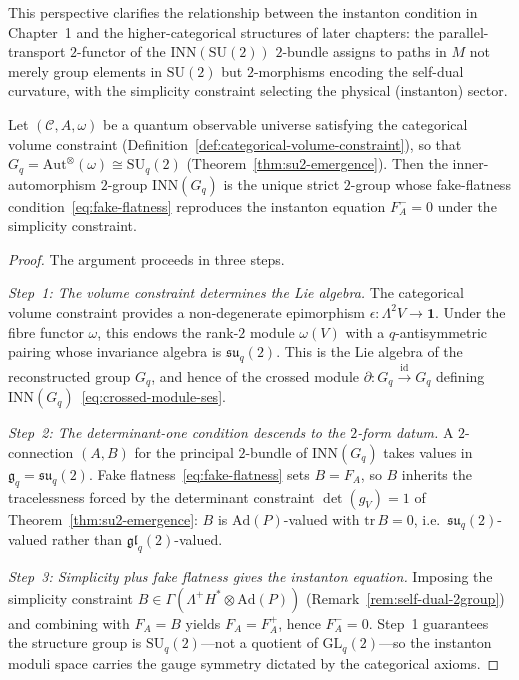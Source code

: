 \begin{remark}
This perspective clarifies the relationship between the instanton
condition in Chapter~1 and the higher-categorical structures of later
chapters: the parallel-transport $2$-functor of the
$\mathrm{INN}(\mathrm{SU}(2))$ $2$-bundle assigns to paths in $M$
not merely group elements in $\mathrm{SU}(2)$ but $2$-morphisms
encoding the self-dual curvature, with the simplicity constraint
selecting the physical (instanton) sector.
\end{remark}

\begin{proposition}
\label{prop:emergence-to-fake-flat}
Let $(\mathcal{C}, A, \omega)$ be a quantum observable universe satisfying
the categorical volume constraint
(Definition~\ref{def:categorical-volume-constraint}), so that
$G_q = \mathrm{Aut}^{\otimes}(\omega) \cong \mathrm{SU}_q(2)$
(Theorem~\ref{thm:su2-emergence}).  Then the inner-automorphism
$2$-group $\mathrm{INN}(G_q)$ is the unique strict $2$-group whose
fake-flatness condition~\eqref{eq:fake-flatness} reproduces the
instanton equation $F_A^{-} = 0$ under the simplicity constraint.
\end{proposition}

\begin{proof}
The argument proceeds in three steps.

\emph{Step~1: The volume constraint determines the Lie algebra.}\;
The categorical volume constraint provides a non-degenerate epimorphism
$\epsilon \colon \Lambda^2 V \to \mathbf{1}$.  Under the fibre functor
$\omega$, this endows the rank-$2$ module $\omega(V)$ with a
$q$-antisymmetric pairing whose invariance algebra is
$\mathfrak{su}_q(2)$.  This is the Lie algebra of the reconstructed
group $G_q$, and hence of the crossed module
$\partial \colon G_q \xrightarrow{\mathrm{id}} G_q$ defining
$\mathrm{INN}(G_q)$~\eqref{eq:crossed-module-ses}.

\emph{Step~2: The determinant-one condition descends to the
$2$-form datum.}\;
A $2$-connection $(A, B)$ for the principal $2$-bundle of
$\mathrm{INN}(G_q)$ takes values in
$\mathfrak{g}_q = \mathfrak{su}_q(2)$.  Fake
flatness~\eqref{eq:fake-flatness} sets $B = F_A$, so $B$ inherits the
tracelessness forced by the determinant constraint
$\det(g_V) = 1$ of Theorem~\ref{thm:su2-emergence}: $B$ is
$\mathrm{Ad}(P)$-valued with $\mathrm{tr}\,B = 0$, i.e.\
$\mathfrak{su}_q(2)$-valued rather than $\mathfrak{gl}_q(2)$-valued.

\emph{Step~3: Simplicity plus fake flatness gives the instanton
equation.}\;
Imposing the simplicity constraint
$B \in \Gamma(\Lambda^+\!H^* \otimes \mathrm{Ad}(P))$
(Remark~\ref{rem:self-dual-2group}) and combining with $F_A = B$
yields $F_A = F_A^+$, hence $F_A^- = 0$.  Step~1 guarantees the
structure group is $\mathrm{SU}_q(2)$---not a quotient of
$\mathrm{GL}_q(2)$---so the instanton moduli space carries the
gauge symmetry dictated by the categorical axioms.
\end{proof}

